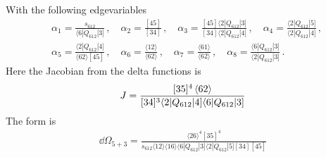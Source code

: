 \documentclass[letter,11pt]{article}
\newcommand{\ab}[1]{\langle #1 \rangle}
\newcommand{\sqb}[1]{[ #1 ]}
\newcommand{\aMs}[3]{\langle #1|#2|#3]}  		%
\newcommand{\sab}[1]{s_{#1}}
\begin{document}
With the following edgevariables
\begin{equation}
	\begin{aligned}
		& \alpha_1 = \frac{\sab{612}}{\aMs{6}{Q_{612}}{3}}\,, \quad \alpha_2 = \frac{[45]}{[34]}\,, \quad \alpha_3 = \frac{[45]\aMs{2}{Q_{612}}{3}}{[34]\aMs{2}{Q_{612}}{4}}\,, \quad \alpha_4 = \frac{\aMs{2}{Q_{612}}{5}}{\aMs{2}{Q_{612}}{4}}\,,\\ 
		&\alpha_5 = \frac{\aMs{2}{Q_{612}}{4}}{\ab{62}[45]}\,, 
		\quad
		\alpha_6 = \frac{\ab{12}}{\ab{62}}\,,\quad \alpha_7 = \frac{\ab{61}}{\ab{62}}\,,\quad
		\alpha_8 =  \frac{\aMs{6}{Q_{612}}{3}}{\aMs{2}{Q_{612}}{3}}\,.
	\end{aligned}
\end{equation}
Here the Jacobian from the delta functions is
\begin{equation}
	\begin{aligned}
		J=\frac{[35]^4\expval{62}}{\sqb{34}^3\aMs{2}{Q_{612}}{4}\aMs{6}{Q_{612}}{3}}
	\end{aligned}
\end{equation}
The form is
\begin{equation}
	\begin{aligned}
		\dd\Omega_{5+3}=\frac{\ab{26}^4 \sqb{35}^4}{s_{612}\ab{12}\ab{16}\aMs{6}{Q_{612}}{3}\aMs{2}{Q_{612}}{5}\sqb{34}\sqb{45}}
	\end{aligned}
\end{equation}
\end{document}
